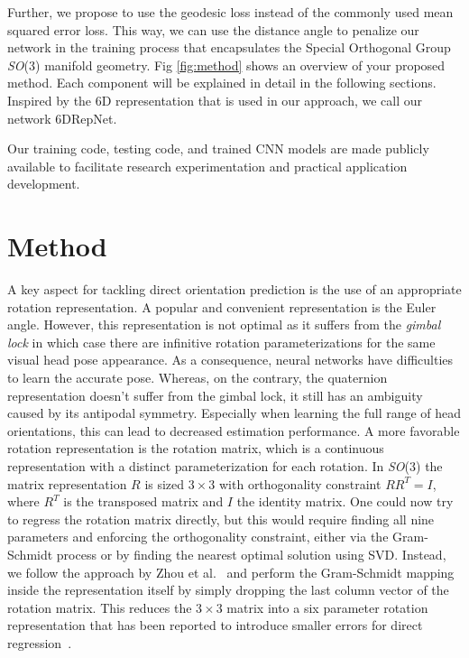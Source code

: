 \documentclass{article}
\newcommand\netname{6DRepNet}
\begin{document}
Further, we propose to use the geodesic loss instead of the commonly used mean squared error loss. This way, we can use the distance angle to penalize our network in the training process that encapsulates the Special Orthogonal Group \textit{SO}(3) manifold geometry. Fig \ref{fig:method} shows an overview of your proposed method. Each component will be explained in detail in the following sections. Inspired by the 6D representation that is used in our approach, we call our network \netname.

Our training code, testing code, and trained CNN models are made publicly available to facilitate research experimentation and practical application development.


\section{Method}
A key aspect for tackling direct orientation prediction is the use of an appropriate rotation representation. A popular and convenient representation is the Euler angle. However, this representation is not optimal as it suffers from the \textit{gimbal lock} in which case there are infinitive rotation parameterizations for the same visual head pose appearance. As a consequence, neural networks have difficulties to learn the accurate pose. Whereas, on the contrary, the quaternion representation doesn't suffer from the gimbal lock, it still has an ambiguity caused by its antipodal symmetry. Especially when learning the full range of head orientations, this can lead to decreased estimation performance. A more favorable rotation representation is the rotation matrix, which is a continuous representation with a distinct parameterization for each rotation. In \textit{SO}(3) the matrix representation $R$ is sized $3\times3$ with orthogonality constraint $RR^T=I$, where $R^T$ is the transposed matrix and $I$ the identity matrix. One could now try to regress the rotation matrix directly, but this would require finding all nine parameters and enforcing the orthogonality constraint, either via the Gram-Schmidt process or by finding the nearest optimal solution using SVD. Instead, we follow the approach by Zhou et al.~\cite{Zhou2019OnTC} and perform the Gram-Schmidt mapping inside the representation itself by simply dropping the last column vector of the rotation matrix. This reduces the $3\times3$ matrix into a six parameter rotation representation that has been reported to introduce smaller errors for direct regression~\cite{Zhou2019OnTC}. 
\end{document}
